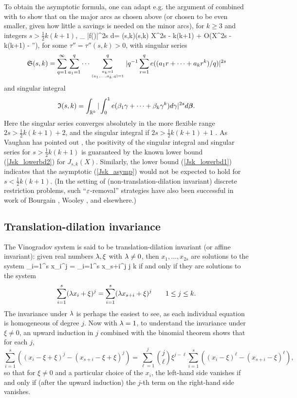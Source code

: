 \documentclass[brochure,english,12pt]{bourbaki}%
\newcommand{\albf}{\boldsymbol\alpha}
\newcommand{\bebf}{\boldsymbol\beta}
\begin{document}
To obtain the asymptotic formula, one can adapt e.g. the argument of \cite[\S 9]{Woo12a} combined with \cite[\S 7.3]{Vau97} to
show that on the major arcs as chosen above (or chosen to be even smaller, given how little a savings is needed on the minor arcs), for $k \geq 3$ and integers $s > \frac{1}{2}k(k+1)$,
\beq\label{Wooley2}
 \int_{} |f(\albf)|^{2s} d\albf  = (s,k)(s,k)  X^{2s - k(k+1) } + O(X^{2s - k(k+1) - \tau''}),
 \eeq
 for some $\tau'' = \tau''(s,k)>0$,
 with singular series
\[
\mathfrak{S}(s,k) = \sum_{q=1}^\infty \sum_{a_1=1}^q \cdots \sum_{a_k=1 \atop (a_1,\ldots, a_k,q)=1}^q
	| q^{-1} \sum_{r=1}^q e((a_1r + \cdots + a_k r^k)/q)|^{2s} \]
and singular integral
\[
\mathfrak{I}(s,k) = \int_{\R^k} | \int_0^1 e(\be_1 \ga + \cdots + \be_k \ga^k ) d\ga |^{2s} d\bebf .
\]
Here the singular series converges absolutely in the more flexible range $2s > \frac{1}{2}k(k+1) + 2$, and the singular integral if $2s> \frac{1}{2}k(k+1) + 1$ \cite[Thm. 3.7]{ACK04}.
 As Vaughan has pointed out \cite[\S 7.3]{Vau97}, the positivity of the singular integral and singular series for $s> \frac{1}{2}k(k+1)$ is guaranteed by the known lower bound (\ref{Jsk_lowerbd2}) for $J_{s,k}(X)$. Similarly, the lower bound (\ref{Jsk_lowerbd1}) indicates that the asymptotic (\ref{Jsk_asymp}) would not be expected to hold for $s < \frac{1}{2}k(k+1)$.
(In the setting of (non-translation-dilation invariant) discrete restriction problems, such ``$\varepsilon$-removal'' strategies have also been successful in work of  Bourgain \cite{Bou89b,Bou93}, Wooley \cite{Woo17a}, and elsewhere.)




\subsection{Translation-dilation invariance}\label{sec_trans_dil}

The Vinogradov system is said to be translation-dilation invariant (or affine invariant): given real numbers $\lambda,\xi$ with $\lambda  \neq 0$, then
$x_1,\ldots, x_{2s}$  are solutions to the system 
\beq\label{Vin_sys_xy}
\sum_{i=1}^s x_i^j = \sum_{i=1}^s x_{s+i}^j   \leq j \leq k
\eeq
if and only if they are solutions to the system
\[ \sum_{i=1}^s (\lambda x_i + \xi)^j = \sum_{i=1}^s (\lambda x_{s+i} + \xi)^j  \qquad 1 \leq j \leq k.\]
The invariance under $\lambda$ is perhaps the easiest to see, as each individual equation is homogeneous of degree $j$.
 Now with $\lambda=1$, to understand the invariance under $\xi \neq 0$, an upward induction in $j$ combined with the binomial theorem shows that for each $j$,
\[ \sum_{i=1}^s ( (x_i -\xi +\xi)^j - (x_{s+i} - \xi+\xi)^j) = \sum_{\ell=1}^j \binom{j}{\ell} \xi^{j-\ell} \sum_{i=1}^s ( (x_i-\xi)^\ell - (x_{s+i}-\xi)^\ell),\]
so that for $\xi \neq 0$ and a particular choice of the $x_i$, the left-hand side vanishes if and only if (after the upward induction) the $j$-th term on the right-hand side vanishes.
\end{document}

